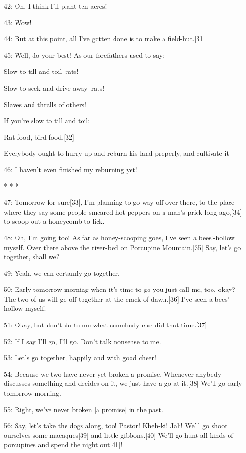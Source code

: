 {\large{}42: Oh, I think I'll plant ten acres! }

{\large{}43: Wow!}

{\large{}44: But at this point, all I've gotten done is to make a field-hut.[31]}

{\large{}45: Well, do your best! As our forefathers used to say:}

{\large{}Slow to till and toil--rats!}

{\large{}Slow to seek and drive away--rats!}

{\large{}Slaves and thralls of others!}

{\large{}If you're slow to till and toil:}

{\large{}Rat food, bird food.[32]}

{\large{}Everybody ought to hurry up and reburn his land properly, and cultivate
it. }

{\large{}46: I haven't even finished my reburning yet!}

{\large{}* * *}

{\large{}47: Tomorrow for sure[33], I'm planning to go way off over there, to the
place where they say some people smeared hot peppers on a man's prick long ago,[34]
to scoop out a honeycomb to lick. }

{\large{}48: Oh, I'm going too! As far as honey-scooping goes, I've seen a bees'-hollow
myself. Over there above the river-bed on Porcupine Mountain.[35] Say, let's go
together, shall we? }

{\large{}49: Yeah, we can certainly go together. }

{\large{}50: Early tomorrow morning when it's time to go you just call me, too,
okay? The two of us will go off together at the crack of dawn.[36] I've seen a
bees'-hollow myself.}

{\large{}51: Okay, but don't do to me what somebody else did that time.[37]}

{\large{}52: If I say I'll go, I'll go. Don't talk nonsense to me. }

{\large{}53: Let's go together, happily and with good cheer! }

{\large{}54: Because we two have never yet broken a promise. Whenever anybody discusses
something and decides on it, we just have a go at it.[38] We'll go early tomorrow
morning. }

{\large{}55: Right, we've never broken [a promise] in the past.}

{\large{}56: Say, let's take the dogs along, too! Pastor! Kheh-ki! Jali! We'll
go shoot ourselves some macaques[39] and little gibbons.[40] We'll go hunt all
kinds of porcupines and spend the night out[41]!}

